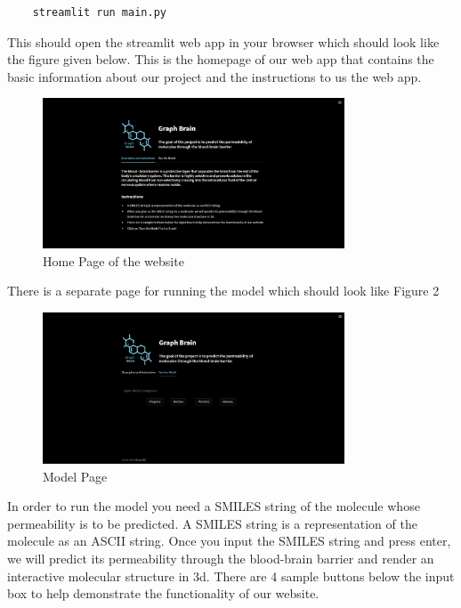 \documentclass[fontsize=11pt]{article}
\begin{document}
\begin{verbatim}
    streamlit run main.py
\end{verbatim}

This should open the streamlit web app in your browser which should look like the figure given below. This is the homepage of our web app that contains the basic information about our project and the instructions to us the web app.

\begin{figure}[ht]
    \centering
    \includegraphics[width=0.8\textwidth]{webapp1.png}
    \caption{Home Page of the website}
    \label{fig:homepage}
\end{figure}

There is a separate page for running the model which should look like Figure 2

\begin{figure}[ht]
    \centering
    \includegraphics[width=0.8\textwidth]{webapp2.png}
    \caption{Model Page}
    \label{fig:modelpage}
\end{figure}

In order to run the model you need a SMILES string of the molecule whose permeability is to be predicted. A SMILES string is a representation of the molecule as an ASCII string. Once you input the SMILES string and press enter, we will predict its permeability through the blood-brain barrier and render an interactive molecular structure in 3d. There are 4 sample buttons below the input box to help demonstrate the functionality of our website.
\end{document}
